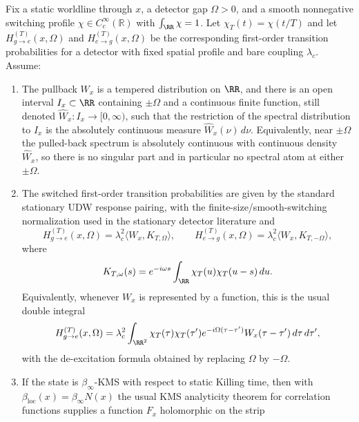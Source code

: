 \begin{assumption}\label{ass:long-time-switch-main}
Fix a static worldline through $x$, a detector gap $\Omega>0$, and a smooth nonnegative switching profile $\chi\in C_c^\infty(\mathbb R)$ with $\int_{\RR}\chi=1$. Let $\chi_T(t)=\chi(t/T)$ and let $H_{g\to e}^{(T)}(x,\Omega)$ and $H_{e\to g}^{(T)}(x,\Omega)$ be the corresponding first-order transition probabilities for a detector with fixed spatial profile and bare coupling $\lambda_c$. Assume:
\begin{enumerate}[label=\textup{(\roman*)},leftmargin=2.2em,itemsep=0.25em]
\item The pullback $W_x$ is a tempered distribution on $\RR$, and there is an open interval $I_x\subset\RR$ containing $\pm\Omega$ and a continuous finite function, still denoted $\widehat W_x:I_x\to[0,\infty)$, such that the restriction of the spectral distribution to $I_x$ is the absolutely continuous measure $\widehat W_x(\nu)\,d\nu$. Equivalently, near $\pm\Omega$ the pulled-back spectrum is absolutely continuous with continuous density $\widehat W_x$, so there is no singular part and in particular no spectral atom at either $\pm\Omega$.
\item The switched first-order transition probabilities are given by the standard stationary UDW response pairing, with the finite-size/smooth-switching normalization used in the stationary detector literature \cite[Sec.~III]{LoukoSatz2006} and \cite[Sec.~II]{LoukoSatz2008}
\begin{equation}\label{eq:switched-pairing-main}
H_{g\to e}^{(T)}(x,\Omega)
=\lambda_c^2\langle W_x,K_{T,\Omega}\rangle,
\qquad
H_{e\to g}^{(T)}(x,\Omega)
=\lambda_c^2\langle W_x,K_{T,-\Omega}\rangle,
\end{equation}
where
\[
K_{T,\omega}(s)=e^{-i\omega s}\int_{\RR}\chi_T(u)\chi_T(u-s)\,du.
\]
Equivalently, whenever $W_x$ is represented by a function, this is the usual double integral
\begin{equation}\label{eq:switched-double-integral-main}
H_{g\to e}^{(T)}(x,\Omega)
=\lambda_c^2\int_{\RR^2}
\chi_T(\tau)\chi_T(\tau')e^{-i\Omega(\tau-\tau')}W_x(\tau-\tau')\,d\tau\,d\tau',
\end{equation}
with the de-excitation formula obtained by replacing $\Omega$ by $-\Omega$.
\item If the state is $\beta_\infty$-KMS with respect to static Killing time, then with $\beta_{\mathrm{loc}}(x)=\beta_\infty N(x)$ the usual KMS analyticity theorem for correlation functions supplies a function $F_x$ holomorphic on the strip \cite{HaagHugenholtzWinnink1967,KayWald1991,BratteliRobinson1997}

\end{enumerate}
\end{assumption}
